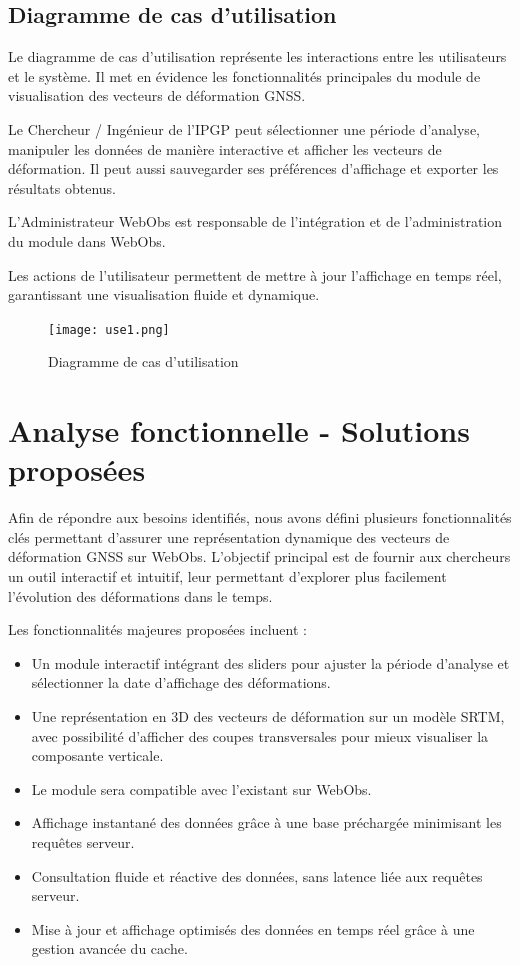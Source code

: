 \documentclass[11pt]{article}
\begin{document}
\subsection{Diagramme de cas d'utilisation}
\vspace{0,1cm}
Le diagramme de cas d'utilisation représente les interactions entre les utilisateurs et le système. Il met en évidence les fonctionnalités principales du module de visualisation des vecteurs de déformation GNSS.

Le Chercheur / Ingénieur de l'IPGP peut sélectionner une période d'analyse, manipuler les données de manière interactive et afficher les vecteurs de déformation. Il peut aussi sauvegarder ses préférences d'affichage et exporter les résultats obtenus.

L'Administrateur WebObs est responsable de l'intégration et de l'administration du module dans WebObs.

Les actions de l'utilisateur permettent de mettre à jour l'affichage en temps réel, garantissant une visualisation fluide et dynamique.
\begin{figure}[h!]
    \centering
    \texttt{[image: use1.png]} 
    \caption{Diagramme de cas d'utilisation} 
\end{figure}

\newpage

\section{Analyse fonctionnelle - Solutions proposées}

Afin de répondre aux besoins identifiés, nous avons défini plusieurs fonctionnalités clés permettant d’assurer une représentation dynamique des vecteurs de déformation GNSS sur WebObs. L'objectif principal est de fournir aux chercheurs un outil interactif et intuitif, leur permettant d'explorer plus facilement l'évolution des déformations dans le temps.

Les fonctionnalités majeures proposées incluent :

\begin{itemize}

    \item Un module interactif intégrant des sliders pour ajuster la période d'analyse et sélectionner la date d'affichage des déformations.
    \item Une représentation en 3D des vecteurs de déformation sur un modèle SRTM, avec possibilité d'afficher des coupes transversales pour mieux visualiser la composante verticale.
    \item Le module sera compatible avec l'existant sur WebObs.
    \item Affichage instantané des données grâce à une base préchargée minimisant les requêtes serveur.
    \item Consultation fluide et réactive des données, sans latence liée aux requêtes serveur.
    \item Mise à jour et affichage optimisés des données en temps réel grâce à une gestion avancée du cache.
    
\end{itemize} 
\end{document}
